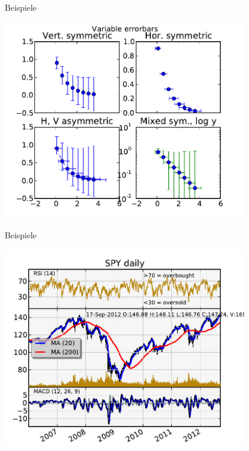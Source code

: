 \begin{frame}{Beispiele}
  \begin{center}
    \includegraphics[width=0.8\textwidth]{img/matplotlib/errorbars.pdf}
  \end{center}
\end{frame}

\begin{frame}{Beispiele}
  \begin{center}
    \includegraphics[width=0.8\textwidth]{img/matplotlib/finance.pdf}
  \end{center}
\end{frame}

